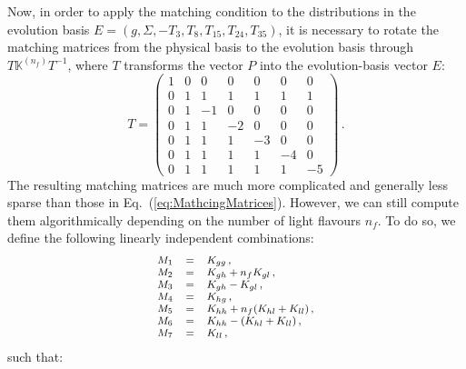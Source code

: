 \documentclass[10pt,a4paper]{article}
\begin{document}
Now, in order to apply the matching condition to the distributions in
the evolution basis $E=(g,\Sigma,-T_3,T_8,T_{15},T_{24},T_{35})$, it is
necessary to rotate the matching matrices from the physical basis to
the evolution basis through $T\mathbb{K}^{(n_f)}T^{-1}$, where $T$
transforms the vector $P$ into the evolution-basis vector $E$:
\begin{equation}\label{eq:RotationMatrix}
T = 
\begin{pmatrix}
1 & 0 & 0  & 0  & 0  & 0  & 0 \\
0 & 1 & 1  & 1  & 1  & 1  & 1 \\
0 & 1 & -1  & 0  & 0  & 0  & 0 \\
0 & 1 & 1  & -2  & 0  & 0  & 0 \\
0 & 1 & 1  & 1  & -3  & 0  & 0 \\
0 & 1 & 1  & 1  & 1  & -4  & 0 \\
0 & 1 & 1  & 1  & 1  & 1  & -5
\end{pmatrix}\,.
\end{equation}
The resulting matching matrices are much more complicated and
generally less sparse than those in
Eq.~(\ref{eq:MathcingMatrices}). However, we can still compute them
algorithmically depending on the number of light flavours $n_f$. To do
so, we define the following linearly independent combinations:
\begin{equation}
\footnotesize
\begin{array}{lcl}
M_1 &=& K_{gg}\,,\\
M_2 &=& K_{gh} + n_f K_{gl}\,,\\
M_3 &=& K_{gh}-K_{gl}\,,\\
M_4 &=& K_{hg}\,,\\
M_5 &=& K_{hh}+n_f(K_{hl}+K_{ll}) \,,\\
M_6 &=& K_{hh}-(K_{hl}+K_{ll})\,,\\
M_7 &=& K_{ll}\,,
\end{array}
\end{equation}
such that:
\end{document}
